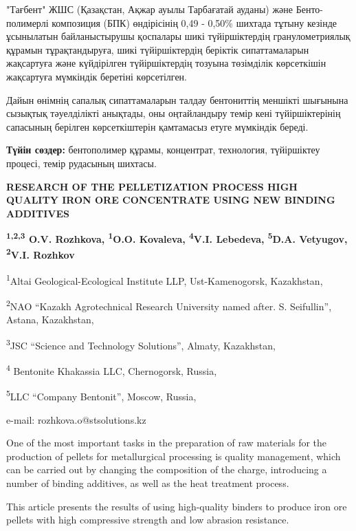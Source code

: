 "Тағбент" ЖШС (Қазақстан, Ақжар ауылы Тарбағатай ауданы) және
Бенто-полимерлі композиция (БПК) өндірісінің 0,49 - 0,50\% шихтада
тұтыну кезінде ұсынылатын байланыстырушы қоспалары шикі түйіршіктердің
гранулометриялық құрамын тұрақтандыруға, шикі түйіршіктердің беріктік
сипаттамаларын жақсартуға және күйдірілген түйіршіктердің тозуына
төзімділік көрсеткішін жақсартуға мүмкіндік беретіні көрсетілген.

Дайын өнімнің сапалық сипаттамаларын талдау бентониттің меншікті
шығынына сызықтық тәуелділікті анықтады, оны оңтайландыру темір кені
түйіршіктерінің сапасының берілген көрсеткіштерін қамтамасыз етуге
мүмкіндік береді.

{\bfseries Түйін сөздер:} бентополимер құрамы, концентрат, технология,
түйіршіктеу процесі, темір рудасының шихтасы.

\begin{articleheader}
{\bfseries RESEARCH OF THE PELLETIZATION PROCESS HIGH QUALITY IRON ORE CONCENTRATE USING NEW BINDING ADDITIVES}

{\bfseries
\textsuperscript{1,2,3} O.V. Rozhkova\textsuperscript{\envelope },
\textsuperscript{1}O.O. Kovaleva,
\textsuperscript{4}V.I. Lebedeva,
\textsuperscript{5}D.A. Vetyugov,
\textsuperscript{2}V.I. Rozhkov
}
\end{articleheader}

\begin{affiliation}
\textsuperscript{1}Altai Geological-Ecological Institute LLP, Ust-Kamenogorsk, Kazakhstan,

\textsuperscript{2}NAO ``Kazakh Agrotechnical Research University named after. S. Seifullin'', Astana, Kazakhstan,

\textsuperscript{3}JSC ``Science and Technology Solutions'', Almaty, Kazakhstan,

\textsuperscript{4} Bentonite Khakassia LLC, Chernogorsk, Russia,

\textsuperscript{5}LLC ``Company Bentonit'', Moscow, Russia,

e-mail: rozhkova.o@stsolutions.kz
\end{affiliation}

One of the most important tasks in the preparation of raw materials for
the production of pellets for metallurgical processing is quality
management, which can be carried out by changing the composition of the
charge, introducing a number of binding additives, as well as the heat
treatment process.

This article presents the results of using high-quality binders to
produce iron ore pellets with high compressive strength and low abrasion
resistance.

